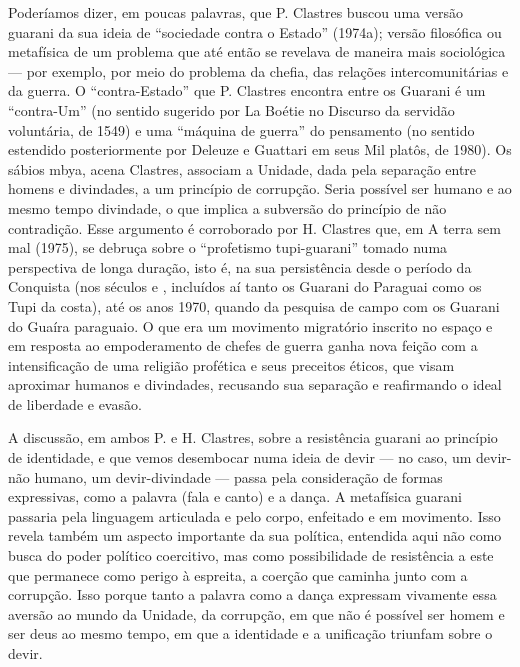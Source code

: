 Poderíamos dizer, em poucas palavras, que P. Clastres buscou uma versão
guarani da sua ideia de ``sociedade contra o Estado'' (1974a); versão
filosófica ou metafísica de um problema que até então se revelava de
maneira mais sociológica --- por exemplo, por meio do problema da chefia,
das relações intercomunitárias e da guerra. O ``contra-Estado'' que P.
Clastres encontra entre os Guarani é um ``contra-Um'' (no sentido
sugerido por La Boétie no Discurso da servidão voluntária, de 1549) e
uma ``máquina de guerra'' do pensamento (no sentido estendido
posteriormente por Deleuze e Guattari em seus Mil platôs, de 1980). Os
sábios mbya, acena Clastres, associam a Unidade, dada pela separação
entre homens e divindades, a um princípio de corrupção. Seria possível
ser humano e ao mesmo tempo divindade, o que implica a subversão do
princípio de não contradição. Esse argumento é corroborado por H.
Clastres que, em A terra sem mal (1975), se debruça sobre o ``profetismo
tupi-guarani'' tomado numa perspectiva de longa duração, isto é, na sua
persistência desde o período da Conquista (nos séculos  e ,
incluídos aí tanto os Guarani do Paraguai como os Tupi da costa), até
os anos 1970, quando da pesquisa de campo com os Guarani do Guaíra
paraguaio. O que era um movimento migratório inscrito no espaço e em
resposta ao empoderamento de chefes de guerra ganha nova feição com a
intensificação de uma religião profética e seus preceitos éticos, que
visam aproximar humanos e divindades, recusando sua separação e
reafirmando o ideal de liberdade e evasão.

A discussão, em ambos P. e H. Clastres, sobre a resistência guarani ao
princípio de identidade, e que vemos desembocar numa ideia de devir ---
no caso, um devir-não humano, um devir-divindade --- passa pela
consideração de formas expressivas, como a palavra (fala e canto) e a
dança. A metafísica guarani passaria pela linguagem articulada e pelo
corpo, enfeitado e em movimento. Isso revela também um aspecto
importante da sua política, entendida aqui não como busca do poder
político coercitivo, mas como possibilidade de resistência a este que
permanece como perigo à espreita, a coerção que caminha junto com a
corrupção. Isso porque tanto a palavra como a dança expressam vivamente
essa aversão ao mundo da Unidade, da corrupção, em que não é possível
ser homem e ser deus ao mesmo tempo, em que a identidade e a unificação
triunfam sobre o devir. 

